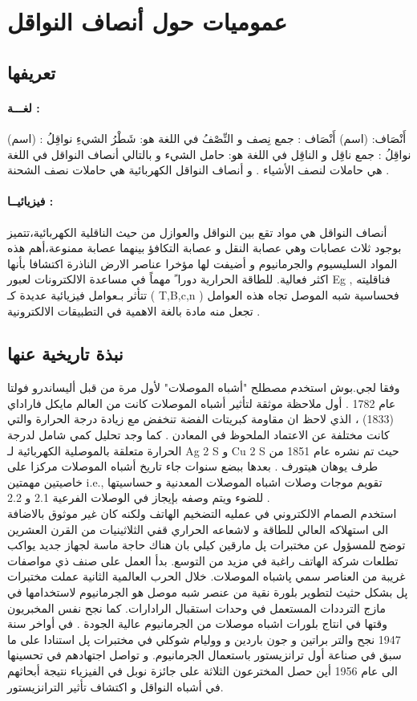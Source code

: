 \section{عموميات حول أنصاف النواقل}
\subsection{تعريفها }
\paragraph{لغـــة :}
أَنْصَاف: (اسم)
أَنْصَاف : جمع نِصف و النِّصْفُ في اللغة هو: شَطْرُ الشيءِ 
نواقِلُ : (اسم)
نواقِلُ : جمع ناقِل و الناقِل في اللغة هو: حامل الشيء
و بالتالي أنصاف النواقل في اللغة هي حاملات لنصف الأشياء .
و أنصاف النواقل الكهربائية هي حاملات نصف الشحنة . \cite{a1}

\paragraph{فيزيائيــا :}
أنصاف النواقل هي مواد تقع بين النواقل والعوازل من حيث الناقلية الكهربائية،تتميز بوجود ثلاث عصابات وهي عصابة النقل و عصابة التكافؤ بينهما عصابة ممنوعة،أهم هذه المواد السليسيوم والجرمانيوم و أضيفت لها مؤخرا عناصر الارض الناذرة اكتشافا بأنها اكثر فعالية. للطاقة الحرارية دورا ً مهماً في مساعدة الالكترونات لعبور Eg , فناقليته تتأثر بـعوامل فيزيائية عديدة كـ ( T,B,c,n ) فحساسية شبه الموصل تجاه هذه العوامل تجعل منه مادة بالغة الاهمية في التطبيقات الالكترونية .
\subsection{نبذة تاريخية عنها }

وفقا لجي.بوش   استخدم مصطلح "أشباه الموصلات" لأول مرة من قبل أليساندرو فولتا عام 1782 .
أول ملاحظة موثقة لتأثير أشباه الموصلات كانت من العالم مايكل فاراداي (1833) ، الذي لاحظ ان مقاومة كبريتات الفضة تنخفض مع زيادة درجة الحرارة  والتي كانت مختلفة عن الاعتماد  الملحوظ في المعادن .
كما وجد تحليل كمي شامل لدرجة الحرارة متعلقة بالموصلية الكهربائية لـ Ag 2 S و Cu 2 S حيث تم نشره عام 1851 من طرف يوهان هيتورف . بعدها ببضع سنوات جاء تاريخ أشباه الموصلات مركزا على خاصيتين مهمتين i.e., تقويم موجات وصلات اشباه الموصلات المعدنية و حساسيتها للضوء ويتم وصفه بإيجاز في الوصلات الفرعية 2.1 و 2.2 .\\ \cite{a5}
استخدم الصمام الالكتروني في عمليه التضخيم الهاتف ولكنه كان غير موثوق بالاضافة الى استهلاكه العالي للطاقة و لاشعاعه الحراري قفي الثلاثينيات من القرن العشرين توضح للمسؤول عن مختبرات پل مارقين كيلي بان هناك حاجة ماسة لجهاز جديد يواكب تطلعات شركة الهاتف راغبة في مزيد من التوسع. بدأ العمل على صنف ذي مواصفات غريبة من العناصر سمي پاشباه الموصلات. خلال الحرب العالمية الثانية عملت مختبرات پل بشكل حثيث لتطوير بلورة نقية من عنصر شبه موصل هو الجرمانيوم لاستخدامها في مازج الترددات المستعمل في وحدات استقبال الرادارات. كما نجح نفس المخبريون وقتها في انتاج بلورات اشباه موصلات من الجرمانيوم عالية الجودة .
في أواخر سنة 1947 نجح والتر براتين و جون باردين و ووليام شوكلي في مختبرات پل استنادا على ما سبق في صناعة أول ترانزيستور باستعمال الجرمانيوم.
و تواصل اجتهادهم في تحسينها الى عام 1956 أين حصل المخترعون الثلاثة على جائزة نوبل في الفيزياء نتيجة أبحاثهم في أشباه النواقل و اكتشاف تأثير الترانزيستور. \cite{a6}


